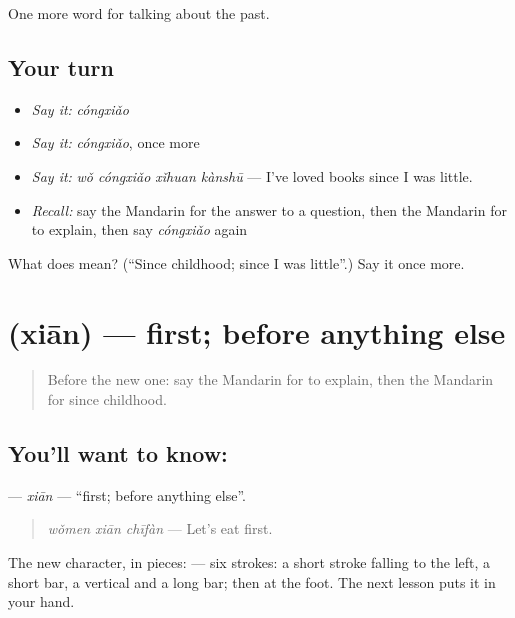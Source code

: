 \begin{grammarlens}[title={What you've built}]
One more word for talking about the past.
\end{grammarlens}

\subsection*{Your turn}
\begin{itemize}
\raggedright
  \item \emph{Say it:} \emph{cóngxiǎo}
  \item \emph{Say it:} \emph{cóngxiǎo}, once more
  \item \emph{Say it:} \emph{wǒ cóngxiǎo xǐhuan kànshū} — I've loved books since I was little.
  \item \emph{Recall:} say the Mandarin for the answer to a question, then the Mandarin for to explain, then say \emph{cóngxiǎo} again
\end{itemize}

\begin{tcolorbox}[breakable,colback=teal!4,colframe=teal!35!black,title={Before you move on}]
What does  mean? (\textquotedblleft{}Since childhood; since I was little\textquotedblright{}.) Say it once more.
\end{tcolorbox}
\section[\texorpdfstring{\zh{先} (xiān)}{先 (xiān)}]{ (xiān) — first; before anything else}

\label{lesson:ZH-C269-xian}



\begin{quote}
Before the new one: say the Mandarin for to explain, then the Mandarin for since childhood.
\end{quote}

\subsection*{You'll want to know: }
\textbf{} — \emph{xiān} — \textquotedblleft{}first; before anything else\textquotedblright{}.

\begin{quote}
\textbf{} \emph{wǒmen xiān chīfàn} — Let's eat first.
\end{quote}

The new character, in pieces:  — six strokes: a short stroke falling to the left, a short bar, a vertical and a long bar; then  at the foot. The next lesson puts it in your hand.

